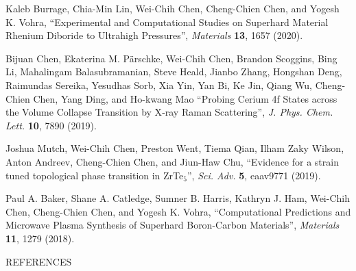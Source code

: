 	\vspace{24pt}
    
    \noindent Kaleb Burrage, Chia-Min Lin, Wei-Chih Chen, Cheng-Chien Chen, and Yogesh K. Vohra, “Experimental and Computational Studies on Superhard Material Rhenium Diboride to Ultrahigh Pressures”, {\it Materials} {\bf 13}, 1657 (2020).
 	
 	\vspace{12pt}
 	
    \noindent Bijuan Chen, Ekaterina M. Pärschke, Wei-Chih Chen, Brandon Scoggins, Bing Li, Mahalingam Balasubramanian, Steve Heald, Jianbo Zhang, Hongshan Deng, \newline Raimundas Sereika, Yesudhas Sorb, Xia Yin, Yan Bi, Ke Jin, Qiang Wu, Cheng-Chien Chen, Yang Ding, and Ho-kwang Mao “Probing Cerium 4f States across the Volume Collapse Transition by X‑ray Raman Scattering”, {\it J. Phys. Chem. Lett.} {\bf 10},  7890 (2019).

 	\vspace{12pt}

    \noindent Joshua Mutch, Wei-Chih Chen, Preston Went, Tiema Qian, Ilham Zaky Wilson, Anton Andreev, Cheng-Chien Chen, and Jiun-Haw Chu, “Evidence for a strain tuned topological phase transition in ZrTe$_5$”, {\it Sci. Adv.} {\bf 5}, eaav9771 (2019).
    
 	\vspace{12pt}

    \noindent Paul A. Baker, Shane A. Catledge, Sumner B. Harris, Kathryn J. Ham, Wei-Chih Chen, Cheng-Chien Chen, and Yogesh K. Vohra, “Computational Predictions and Microwave Plasma Synthesis of Superhard Boron-Carbon Materials”, {\it Materials} {\bf 11}, 1279 (2018).

	

	
	
	
	\pagebreak

	{\centering
		\vspace{0pt} \hspace{0pt} \par
	}
	{\centering
		\vspace{24pt} \hspace{0pt} \par
	}
	\hfill  REFERENCES { } { } \hfill
	{\centering
		\vspace{0.2in} \hspace{0pt} \par
	}
	
    
%    
%    
    

